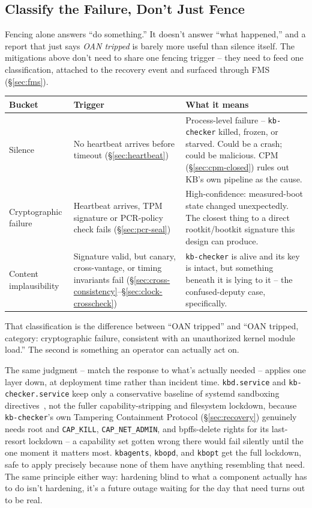 \documentclass[11pt,a4paper]{article}
\begin{document}
\subsection{Classify the Failure, Don't Just Fence}
\label{sec:classify}

Fencing alone answers ``do something.'' It doesn't answer ``what
happened,'' and a report that just says \emph{OAN tripped} is barely
more useful than silence itself. The mitigations above don't need to
share one fencing trigger -- they need to feed one classification,
attached to the recovery event and surfaced through FMS
(\S\ref{sec:fms}).

\begin{center}
\renewcommand{\arraystretch}{1.45}
\small
\begin{tabular}{@{}p{2.9cm}p{4.6cm}p{5.5cm}@{}}
\toprule
\textbf{Bucket} & \textbf{Trigger} & \textbf{What it means} \\
\midrule
Silence & No heartbeat arrives before timeout (\S\ref{sec:heartbeat}) &
Process-level failure -- \texttt{kb-checker} killed, frozen, or
starved. Could be a crash; could be malicious. CPM
(\S\ref{sec:cpm-closed}) rules out KB's own pipeline as the cause. \\
Cryptographic failure & Heartbeat arrives, TPM signature or PCR-policy
check fails (\S\ref{sec:pcr-seal}) & High-confidence: measured-boot
state changed unexpectedly. The closest thing to a direct
rootkit/bootkit signature this design can produce. \\
Content implausibility & Signature valid, but canary, cross-vantage, or
timing invariants fail (\S\ref{sec:cross-consistency}--\S\ref{sec:clock-crosscheck}) &
\texttt{kb-checker} is alive and its key is intact, but something
beneath it is lying to it -- the confused-deputy case, specifically. \\
\bottomrule
\end{tabular}
\end{center}

That classification is the difference between ``OAN tripped'' and
``OAN tripped, category: cryptographic failure, consistent with an
unauthorized kernel module load.'' The second is something an operator
can actually act on.

The same judgment -- match the response to what's actually needed --
applies one layer down, at deployment time rather than incident time.
\texttt{kbd.service} and \texttt{kb-checker.service} keep only a
conservative baseline of systemd sandboxing directives~\cite{systemdexec}, not the fuller
capability-stripping and filesystem lockdown, because
\texttt{kb-checker}'s own Tampering Containment Protocol
(\S\ref{sec:recovery}) genuinely needs root and \texttt{CAP\_KILL},
\texttt{CAP\_NET\_ADMIN}, and bpffs-delete rights for its last-resort
lockdown -- a capability set gotten wrong there would fail silently
until the one moment it matters most. \texttt{kbagents},
\texttt{kbopd}, and \texttt{kbopt} get the full lockdown, safe to apply
precisely because none of them have anything resembling that need. The
same principle either way: hardening blind to what a component
actually has to do isn't hardening, it's a future outage waiting for
the day that need turns out to be real.
\end{document}
